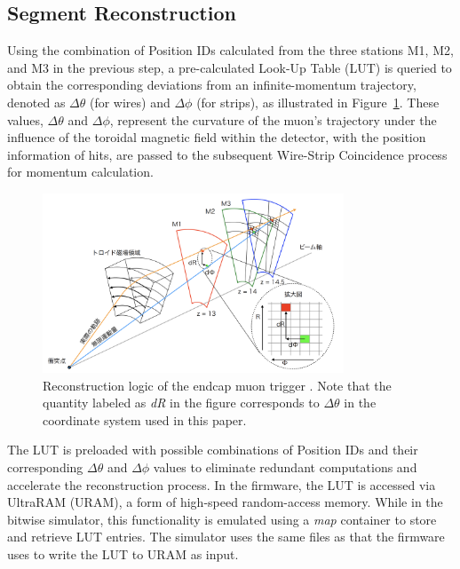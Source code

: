 \subsection{Segment Reconstruction} \label{subsec:SegRec}
Using the combination of Position IDs calculated from the three stations M1, M2, and M3 in the previous step, a pre-calculated Look-Up Table (LUT) is queried to obtain the corresponding deviations from an infinite-momentum trajectory, denoted as $\Delta\theta$ (for wires) and $\Delta\phi$ (for strips), as illustrated in Figure~\ref{fig:EndcapTriggerLogic}. These values, $\Delta\theta$ and $\Delta\phi$, represent the curvature of the muon’s trajectory under the influence of the toroidal magnetic field within the detector, with the position information of hits, are passed to the subsequent Wire-Strip Coincidence process for momentum calculation.

\begin{figure}[htbp]
  \centering
  \includegraphics[width=0.8\textwidth]{figs/chapter5/endcap_trigger_logic_concept.png}
  \caption{Reconstruction logic of the endcap muon trigger \cite{akatsuka}. Note that the quantity labeled as \textit{dR} in the figure corresponds to $\Delta\theta$ in the coordinate system used in this paper.}
  \label{fig:EndcapTriggerLogic}
\end{figure}

The LUT is preloaded with possible combinations of Position IDs and their corresponding $\Delta\theta$ and $\Delta\phi$ values to eliminate redundant computations and accelerate the reconstruction process. In the firmware, the LUT is accessed via UltraRAM (URAM), a form of high-speed random-access memory. While in the bitwise simulator, this functionality is emulated using a \textit{map} container to store and retrieve LUT entries. The simulator uses the same files as that the firmware uses to write the LUT to URAM as input.

